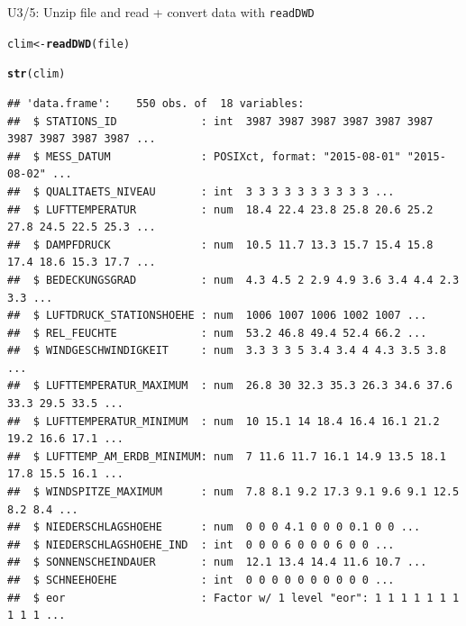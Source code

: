 \documentclass[compress, xcolor=dvipsnames]{beamer}\usepackage[]{graphicx}\usepackage[]{color}
\makeatletter
\newcommand{\hlstd}[1]{\textcolor[rgb]{0.345,0.345,0.345}{#1}}%
\newcommand{\hlkwb}[1]{\textcolor[rgb]{0.69,0.353,0.396}{#1}}%
\newcommand{\hlkwd}[1]{\textcolor[rgb]{0.737,0.353,0.396}{\textbf{#1}}}%
\newenvironment{kframe}{%
 \def\at@end@of@kframe{}%
 \ifinner\ifhmode%
  \def\at@end@of@kframe{\end{minipage}}%
  \begin{minipage}{\columnwidth}%
 \fi\fi%
 \def\FrameCommand##1{\hskip\@totalleftmargin \hskip-\fboxsep
 \colorbox{shadecolor}{##1}\hskip-\fboxsep
     \hskip-\linewidth \hskip-\@totalleftmargin \hskip\columnwidth}%
 \MakeFramed {\advance\hsize-\width
   \@totalleftmargin\z@ \linewidth\hsize
   \@setminipage}}%
 {\par\unskip\endMakeFramed%
 \at@end@of@kframe}
\newenvironment{knitrout}{}{} %
\makeatother
\begin{document}
\begin{frame}[fragile]{U3/5: Unzip file and read + convert data with \texttt{readDWD}}
\label{ur}
\pause
\begin{knitrout}
\color{fgcolor}\begin{kframe}
\begin{alltt}
\hlstd{clim} \hlkwb{<-} \hlkwd{readDWD}\hlstd{(file)}
\end{alltt}
\end{kframe}
\end{knitrout}
\pause
\begin{knitrout}\tiny
{}\color{fgcolor}\begin{kframe}
\begin{alltt}
\hlkwd{str}\hlstd{(clim)}
\end{alltt}
\begin{verbatim}
## 'data.frame':	550 obs. of  18 variables:
##  $ STATIONS_ID             : int  3987 3987 3987 3987 3987 3987 3987 3987 3987 3987 ...
##  $ MESS_DATUM              : POSIXct, format: "2015-08-01" "2015-08-02" ...
##  $ QUALITAETS_NIVEAU       : int  3 3 3 3 3 3 3 3 3 3 ...
##  $ LUFTTEMPERATUR          : num  18.4 22.4 23.8 25.8 20.6 25.2 27.8 24.5 22.5 25.3 ...
##  $ DAMPFDRUCK              : num  10.5 11.7 13.3 15.7 15.4 15.8 17.4 18.6 15.3 17.7 ...
##  $ BEDECKUNGSGRAD          : num  4.3 4.5 2 2.9 4.9 3.6 3.4 4.4 2.3 3.3 ...
##  $ LUFTDRUCK_STATIONSHOEHE : num  1006 1007 1006 1002 1007 ...
##  $ REL_FEUCHTE             : num  53.2 46.8 49.4 52.4 66.2 ...
##  $ WINDGESCHWINDIGKEIT     : num  3.3 3 3 5 3.4 3.4 4 4.3 3.5 3.8 ...
##  $ LUFTTEMPERATUR_MAXIMUM  : num  26.8 30 32.3 35.3 26.3 34.6 37.6 33.3 29.5 33.5 ...
##  $ LUFTTEMPERATUR_MINIMUM  : num  10 15.1 14 18.4 16.4 16.1 21.2 19.2 16.6 17.1 ...
##  $ LUFTTEMP_AM_ERDB_MINIMUM: num  7 11.6 11.7 16.1 14.9 13.5 18.1 17.8 15.5 16.1 ...
##  $ WINDSPITZE_MAXIMUM      : num  7.8 8.1 9.2 17.3 9.1 9.6 9.1 12.5 8.2 8.4 ...
##  $ NIEDERSCHLAGSHOEHE      : num  0 0 0 4.1 0 0 0 0.1 0 0 ...
##  $ NIEDERSCHLAGSHOEHE_IND  : int  0 0 0 6 0 0 0 6 0 0 ...
##  $ SONNENSCHEINDAUER       : num  12.1 13.4 14.4 11.6 10.7 ...
##  $ SCHNEEHOEHE             : int  0 0 0 0 0 0 0 0 0 0 ...
##  $ eor                     : Factor w/ 1 level "eor": 1 1 1 1 1 1 1 1 1 1 ...
\end{verbatim}
\end{kframe}
\end{knitrout}
\end{frame}
\end{document}
